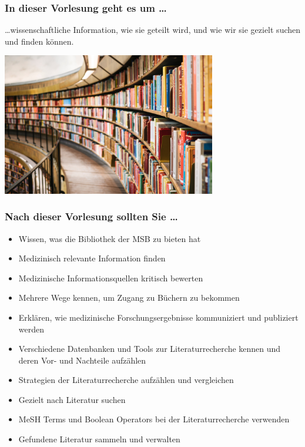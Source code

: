 \documentclass{beamer}
\begin{document}
\begin{frame}
\frametitle{In dieser Vorlesung geht es um \dots}

\dots wissenschaftliche Information, wie sie geteilt wird, und wie wir sie gezielt suchen und finden können.

\begin{center}
    \includegraphics[width=0.7\textwidth]{susan-q-yin-2JIvboGLeho-unsplash.jpg}
\end{center}


 
\end{frame}




\begin{frame}

\frametitle{Nach dieser Vorlesung sollten Sie \dots}


\begin{itemize}
\item
Wissen, was die Bibliothek der MSB zu bieten hat
\item 
Medizinisch relevante Information finden
\item 
Medizinische Informationsquellen kritisch bewerten
\item 
Mehrere Wege kennen, um Zugang zu Büchern zu bekommen
\item 
Erklären, wie medizinische Forschungsergebnisse kommuniziert und publiziert werden
\item 
Verschiedene Datenbanken und Tools zur Literaturrecherche kennen und deren Vor- und Nachteile aufzählen
\item 
Strategien der Literaturrecherche aufzählen und vergleichen
\item 
Gezielt nach Literatur suchen
\item 
MeSH Terms und Boolean Operators bei der Literaturrecherche verwenden
\item 
Gefundene Literatur sammeln und verwalten
\end{itemize}

\end{frame}
\end{document}
